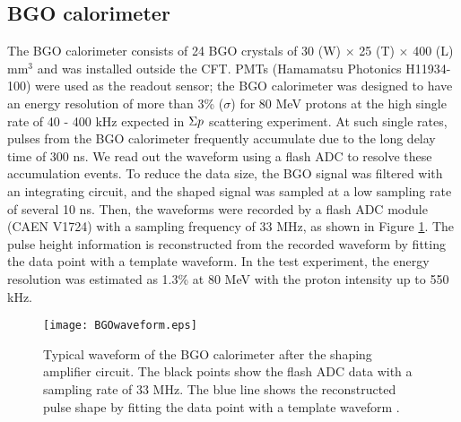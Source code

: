 %
\subsection{BGO calorimeter}
The BGO calorimeter consists of 24 BGO crystals of 30 (W) $\times$ 25 (T) $\times$ 400 (L) mm$^{3}$ and was installed outside the CFT. PMTs (Hamamatsu Photonics H11934-100) were used as the readout sensor; the BGO calorimeter was designed to have an energy resolution of more than 3\% ($\sigma$) for 80 MeV protons at the high single rate of 40 - 400 kHz expected in $\Sigma p$ scattering experiment. At such single rates, pulses from the BGO calorimeter frequently accumulate due to the long delay time of 300 ns. We read out the waveform using a flash ADC to resolve these accumulation events. To reduce the data size, the BGO signal was filtered with an integrating circuit, and the shaped signal was sampled at a low sampling rate of several 10 ns. Then, the waveforms were recorded by a flash ADC module (CAEN V1724) with a sampling frequency of 33 MHz, as shown in Figure \ref{fig-BGOwaveform}. The pulse height information is reconstructed from the recorded waveform by fitting the data point with a template waveform. In the test experiment, the energy resolution was estimated as 1.3\% at 80 MeV with the proton intensity up to 550 kHz.
\begin{figure}[!h]
 \begin{center}
   \texttt{[image: BGOwaveform.eps]}
   \caption{Typical waveform of the BGO calorimeter after the shaping amplifier circuit. The black points show the flash ADC data with a sampling rate of 33 MHz. The blue line shows the reconstructed pulse shape by fitting the data point with a template waveform \cite{Aka-2020}.}
   \label{fig-BGOwaveform}
 \end{center}
\end{figure}

%
